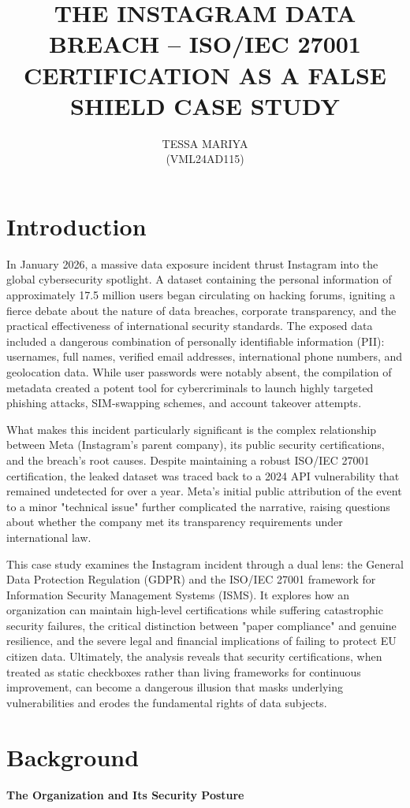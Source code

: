 \documentclass{article}
\title{THE INSTAGRAM DATA BREACH – ISO/IEC 27001 CERTIFICATION AS A FALSE SHIELD CASE STUDY}
\author{TESSA MARIYA \\(VML24AD115)}
\date{}
\begin{document}
\maketitle

\section{Introduction}
In January 2026, a massive data exposure incident thrust Instagram into the global cybersecurity spotlight. A dataset containing the personal information of approximately 17.5 million users began circulating on hacking forums, igniting a fierce debate about the nature of data breaches, corporate transparency, and the practical effectiveness of international security standards. The exposed data included a dangerous combination of personally identifiable information (PII): usernames, full names, verified email addresses, international phone numbers, and geolocation data. While user passwords were notably absent, the compilation of metadata created a potent tool for cybercriminals to launch highly targeted phishing attacks, SIM-swapping schemes, and account takeover attempts.

What makes this incident particularly significant is the complex relationship between Meta (Instagram's parent company), its public security certifications, and the breach's root causes. Despite maintaining a robust ISO/IEC 27001 certification, the leaked dataset was traced back to a 2024 API vulnerability that remained undetected for over a year. Meta’s initial public attribution of the event to a minor "technical issue" further complicated the narrative, raising questions about whether the company met its transparency requirements under international law.

This case study examines the Instagram incident through a dual lens: the General Data Protection Regulation (GDPR) and the ISO/IEC 27001 framework for Information Security Management Systems (ISMS). It explores how an organization can maintain high-level certifications while suffering catastrophic security failures, the critical distinction between "paper compliance" and genuine resilience, and the severe legal and financial implications of failing to protect EU citizen data. Ultimately, the analysis reveals that security certifications, when treated as static checkboxes rather than living frameworks for continuous improvement, can become a dangerous illusion that masks underlying vulnerabilities and erodes the fundamental rights of data subjects.
\section{Background}
\textbf{The Organization and Its Security Posture}
\end{document}
